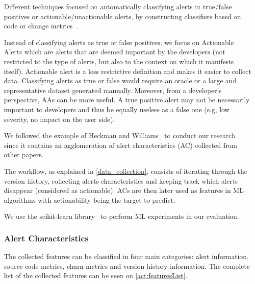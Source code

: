 Different techniques focused on automatically classifying alerts in true/false positives or actionable/unactionable alerts, by constructing classifiers based on code or change metrics~\cite{actionable_sa, model_building_actionable}.

Instead of classifying alerts as true or false positives, we focus on Actionable Alerts which are alerts that are deemed important by the developers (not restricted to the type of alerts, but also to the context on which it manifests itself). Actionable alert is a less restrictive definition and makes it easier to collect data. Classifying alerts as true or false would require an oracle or a large and representative dataset generated manually. Moreover, from a developer's perspective, AAs can be more useful. A true positive alert may not be necessarily important to developers and thus be equally useless as a false one (e.g, low severity, no impact on the user side).

We followed the example of Heckman and Williams~\cite{model_building_actionable} to conduct our research since it contains an agglomeration of alert characteristics (AC) collected from other papers.

The workflow, as explained in \cref{data_collection}, consists of iterating through the version history, collecting alerts characteristics and keeping track which alerts disappear (considered as actionable). ACs are then later used as features in ML algorithms with actionability being the target to predict.

We use the scikit-learn library~\cite{scikit-learn} to perform ML experiments in our evaluation.

\subsubsection{Alert Characteristics}

The collected features can be classified in four main categories: alert information, source code metrics, churn metrics and version history information. The complete list of the collected features can be seen on \cref{act:featuresList}.

